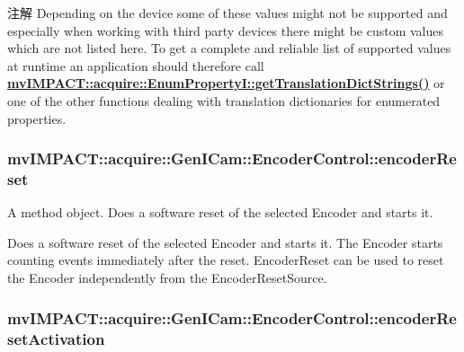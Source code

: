 \begin{DoxyNote}{注解}
Depending on the device some of these values might not be supported and especially when working with third party devices there might be custom values which are not listed here. To get a complete and reliable list of supported values at runtime an application should therefore call {\bfseries \hyperlink{classmv_i_m_p_a_c_t_1_1acquire_1_1_enum_property_i_a0ba6ccbf5ee69784d5d0b537924d26b6}{mv\+I\+M\+P\+A\+C\+T\+::acquire\+::\+Enum\+Property\+I\+::get\+Translation\+Dict\+Strings()}} or one of the other functions dealing with translation dictionaries for enumerated properties. 
\end{DoxyNote}
\hypertarget{classmv_i_m_p_a_c_t_1_1acquire_1_1_gen_i_cam_1_1_encoder_control_a09291b0a28dfba6043befecf136894cc}{
\subsubsection[{encoder\+Reset}]{ mv\+I\+M\+P\+A\+C\+T\+::acquire\+::\+Gen\+I\+Cam\+::\+Encoder\+Control\+::encoder\+Reset}}\label{classmv_i_m_p_a_c_t_1_1acquire_1_1_gen_i_cam_1_1_encoder_control_a09291b0a28dfba6043befecf136894cc}


A method object. Does a software reset of the selected Encoder and starts it. 

Does a software reset of the selected Encoder and starts it. The Encoder starts counting events immediately after the reset. Encoder\+Reset can be used to reset the Encoder independently from the Encoder\+Reset\+Source. \hypertarget{classmv_i_m_p_a_c_t_1_1acquire_1_1_gen_i_cam_1_1_encoder_control_a4368e6fc149c01b706f2e89d522c1a4a}{
\subsubsection[{encoder\+Reset\+Activation}]{ mv\+I\+M\+P\+A\+C\+T\+::acquire\+::\+Gen\+I\+Cam\+::\+Encoder\+Control\+::encoder\+Reset\+Activation}}\label{classmv_i_m_p_a_c_t_1_1acquire_1_1_gen_i_cam_1_1_encoder_control_a4368e6fc149c01b706f2e89d522c1a4a}


